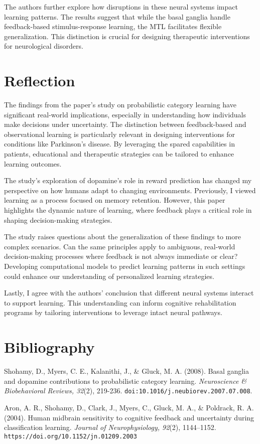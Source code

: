 \documentclass[12pt]{article}
\begin{document}
The authors further explore how disruptions in these neural systems impact learning patterns. The results suggest that while the basal ganglia handle feedback-based stimulus-response learning, the MTL facilitates flexible generalization. This distinction is crucial for designing therapeutic interventions for neurological disorders.

\section*{Reflection}
The findings from the paper's study on probabilistic category learning have significant real-world implications, especially in understanding how individuals make decisions under uncertainty. The distinction between feedback-based and observational learning is particularly relevant in designing interventions for conditions like Parkinson's disease. By leveraging the spared capabilities in patients, educational and therapeutic strategies can be tailored to enhance learning outcomes.

The study's exploration of dopamine's role in reward prediction has changed my perspective on how humans adapt to changing environments. Previously, I viewed learning as a process focused on memory retention. However, this paper highlights the dynamic nature of learning, where feedback plays a critical role in shaping decision-making strategies.

The study raises questions about the generalization of these findings to more complex scenarios. Can the same principles apply to ambiguous, real-world decision-making processes where feedback is not always immediate or clear? Developing computational models to predict learning patterns in such settings could enhance our understanding of personalized learning strategies.

Lastly, I agree with the authors’ conclusion that different neural systems interact to support learning. This understanding can inform cognitive rehabilitation programs by 
tailoring interventions to leverage intact neural pathways.


\section*{Bibliography}
\noindent Shohamy, D., Myers, C. E., Kalanithi, J., \& Gluck, M. A. (2008). Basal ganglia and dopamine contributions to probabilistic category learning. \textit{Neuroscience \& Biobehavioral Reviews, 32}(2), 219-236. \texttt{doi:10.1016/j.neubiorev.2007.07.008}.

\noindent Aron, A. R., Shohamy, D., Clark, J., Myers, C., Gluck, M. A., \& Poldrack, R. A. (2004). Human midbrain sensitivity to cognitive feedback and uncertainty during classification learning. \textit{Journal of Neurophysiology, 92}(2), 1144–1152. 
\texttt{https://doi.org/10.1152/jn.01209.2003}
\end{document}
